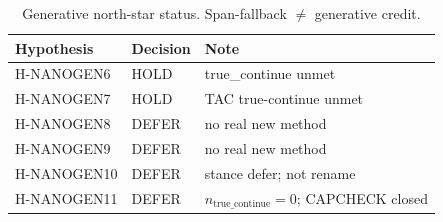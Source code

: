 \begin{table}[t]
\centering
\caption{Generative north-star status. Span-fallback $\neq$ generative credit.}
\label{tab:gen}
\begin{tabular}{lll}
\toprule
Hypothesis & Decision & Note \\
\midrule
H-NANOGEN6 & HOLD & true\_continue unmet \\
H-NANOGEN7 & HOLD & TAC true-continue unmet \\
H-NANOGEN8 & DEFER & no real new method \\
H-NANOGEN9 & DEFER & no real new method \\
H-NANOGEN10 & DEFER & stance defer; not rename \\
H-NANOGEN11 & DEFER & $n_{\mathrm{true\_continue}}=0$; CAPCHECK closed \\
\bottomrule
\end{tabular}
\end{table}
